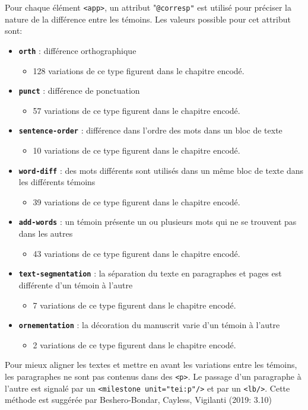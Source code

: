 \documentclass[12pt, a4paper]{article}
\begin{document}
	Pour chaque élément \texttt{<app>}, un attribut "\texttt{@corresp"} est utilisé pour préciser la nature de la différence entre les témoins. Les valeurs possible pour cet attribut sont: \begin{itemize} 
		\item{\textbf{\texttt{orth}} : différence orthographique} \begin{itemize} \item{128 variations de ce type figurent dans le chapitre encodé.} \end{itemize} 
		\item{\textbf{\texttt{punct}} : différence de ponctuation} \begin{itemize} \item{57 variations de ce type figurent dans le chapitre encodé.} \end{itemize} 
		\item{\textbf{\texttt{sentence-order}} : différence dans l'ordre des mots dans un bloc de texte} \begin{itemize} \item{10 variations de ce type figurent dans le chapitre encodé.} \end{itemize} 
		\item{\textbf{\texttt{word-diff}} : des mots différents sont utilisés dans un même bloc de texte dans les différents témoins} \begin{itemize} \item{39 variations de ce type figurent dans le chapitre encodé.} \end{itemize} 
		\item{\textbf{\texttt{add-words}} : un témoin présente un ou plusieurs mots qui ne se trouvent pas dans les autres} \begin{itemize} \item{43 variations de ce type figurent dans le chapitre encodé.} \end{itemize} 
		\item{\textbf{\texttt{text-segmentation}} : la séparation du texte en paragraphes et pages est différente d'un témoin à l'autre} \begin{itemize} \item{7 variations de ce type figurent dans le chapitre encodé.} \end{itemize} 
		\item{\textbf{\texttt{ornementation}} : la décoration du manuscrit varie d'un témoin à l'autre} \begin{itemize} \item{2 variations de ce type figurent dans le chapitre encodé.} \end{itemize} 
	\end{itemize} 
	Pour mieux aligner les textes et mettre en avant les variations entre les témoins, les paragraphes ne sont pas contenus dans des \texttt{<p>}.
	Le passage d'un paragraphe à l'autre est signalé par un \texttt{<milestone unit="tei:p"/>} et par un \texttt{<lb/>}.
	Cette méthode est suggérée par Beshero-Bondar, Cayless, Vigilanti (2019: 3.10)
	
\end{document}
